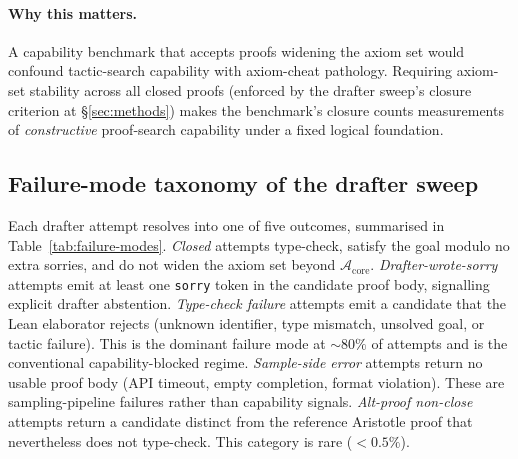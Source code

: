 \paragraph{Why this matters.}
A capability benchmark that accepts proofs widening the axiom
set would confound tactic-search capability with axiom-cheat
pathology. Requiring axiom-set stability across all closed proofs
(enforced by the drafter sweep's closure criterion at
\S\ref{sec:methods}) makes the benchmark's closure counts
measurements of \emph{constructive} proof-search capability under
a fixed logical foundation.

\subsection{Failure-mode taxonomy of the drafter sweep}
\label{app:failure-modes}

Each drafter attempt resolves into one of five outcomes,
summarised in Table~\ref{tab:failure-modes}. \emph{Closed} attempts
type-check, satisfy the goal modulo no extra sorries, and do not
widen the axiom set beyond $\mathcal{A}_{\text{core}}$.
\emph{Drafter-wrote-sorry} attempts emit at least one
\texttt{sorry} token in the candidate proof body, signalling
explicit drafter abstention. \emph{Type-check failure} attempts
emit a candidate that the Lean elaborator rejects (unknown
identifier, type mismatch, unsolved goal, or tactic failure).
This is the dominant failure mode at $\sim 80\%$ of attempts and
is the conventional capability-blocked regime. \emph{Sample-side
error} attempts return no usable proof body (API timeout,
empty completion, format violation). These are sampling-pipeline
failures rather than capability signals. \emph{Alt-proof
non-close} attempts return a candidate distinct from the
reference Aristotle proof that nevertheless does not type-check.
This category is rare ($<0.5\%$).


